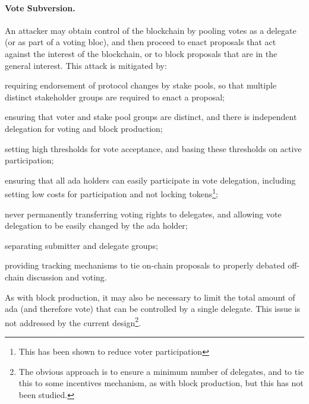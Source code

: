 \paragraph{Vote Subversion.}
An attacker may obtain control of the blockchain by pooling votes as a delegate (or as part of a voting bloc), and then proceed to enact proposals that act against the interest of the blockchain, or to block
proposals that are in the general interest.   This attack is mitigated by:
  \begin{inparaenum}
  \item
    requiring endorsement of protocol changes by stake pools, so that multiple distinct stakeholder groups are required to enact a proposal;
  \item
    ensuring that voter and stake pool groups are distinct, and there is independent delegation for voting and block production;
  \item
    setting high thresholds for vote acceptance, and basing these thresholds on active participation;
  \item
    ensuring that all ada holders can easily participate in vote delegation, including setting low costs for participation and not locking tokens\footnote{This has been shown to reduce voter participation};
  \item
    never permanently transferring voting rights to delegates, and allowing vote delegation to be easily changed by the ada holder;
  \item
    separating submitter and delegate groups;
  \item
    providing tracking mechanisms to tie on-chain proposals to properly debated off-chain discussion and voting.
  \end{inparaenum}

  As with block production, it may also be necessary to limit the total amount of ada (and therefore vote) that can be controlled by a single delegate.
  This issue is not addressed by the current design\footnote{The obvious approach is to ensure a minimum number of delegates, and to tie this to
    some incentives mechanism, as with block production, but this has not been studied.}.

